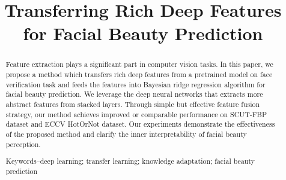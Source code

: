 \documentclass[a4paper,conference]{IEEEtran}
\begin{document}
\title{Transferring Rich Deep Features \\for Facial Beauty Prediction}


\author{
\and
{}
\and
{}
}













\maketitle

\begin{abstract}
Feature extraction plays a significant part in computer vision tasks.
In this paper, we propose a method which transfers rich deep features from
a pretrained model on face verification task and feeds the features into Bayesian
ridge regression algorithm for  facial beauty prediction.
We leverage the deep neural networks that extracts more abstract features from stacked
layers. Through simple but effective feature fusion strategy, our method achieves
improved or comparable performance on SCUT-FBP dataset and ECCV HotOrNot dataset.
Our experiments demonstrate the effectiveness of the proposed method and clarify the inner
interpretability of facial beauty perception.

Keywords--deep learning; transfer learning; knowledge adaptation;
facial beauty prediction
\end{abstract}
\end{document}
